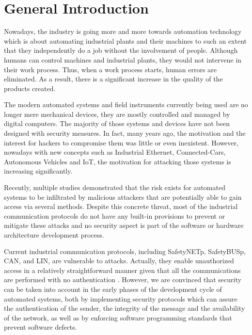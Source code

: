 \chapter*{General Introduction}

Nowadays, the industry is going more and more towards automation technology which is about automating industrial
plants and their machines to such an extent that they independently do a job without the involvement of people.
Although humans can control machines and industrial plants, they would not intervene in their work process.
Thus, when a work process starts, human errors are eliminated. As a result, there is a significant
increase in the quality of the products created.

The modern automated systems and field instruments currently being used are no longer mere mechanical devices,
they are mostly controlled and managed by digital computers\cite{koscher2010experimental}. The majority of
those systems and devices have not been designed with security measures\cite{zurawski2014industrial}. In fact,
many years ago, the motivation and the interest for hackers to compromise them was little or even inexistent.
However, nowadays with new concepts such as Industrial Ethernet, Connected-Cars, Autonomous Vehicles and \ac{IoT}, the motivation for attacking those systems is increasing significantly.

Recently, multiple studies \cite{koscher2010experimental} demonstrated that the risk exists for automated systems to be
infiltrated by malicious attackers that are potentially able to gain access via several methods. Despite this concrete threat,
most of the industrial communication protocols do not have any built-in provisions to prevent or mitigate these attacks and
no security aspect is part of the software or hardware architecture development
process.

Current industrial communication protocols, including SafetyNETp, SafetyBUSp, \ac{CAN}, and
\ac{LIN}, are vulnerable to attacks. Actually, they enable unauthorized access
in a relatively straightforward manner given that all the communications are performed with no authentication \cite{zurawski2014industrial}.
However, we are convinced that security can be taken into account in the early phases of
the development cycle of automated systems, both by implementing security protocols
which can assure the authentication of the sender, the integrity of the message and the availability
of the network, as well as by enforcing software programming standards that prevent software defects.

